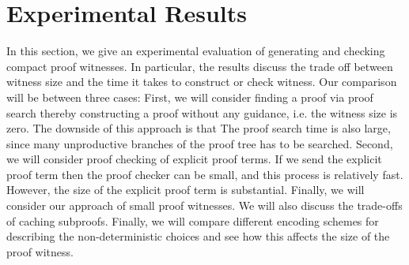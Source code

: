 \documentclass{llncs}
\newcommand{\vd}{\vdash}
\begin{document}







\section{Experimental Results}

In this section, we give an experimental evaluation of generating and
checking compact proof witnesses. In particular, the results discuss
the trade off between witness size and the time it takes to construct
or check witness. Our comparison will be between three cases: First,
we will consider finding a proof via proof search thereby constructing
a proof without any guidance, i.e. the witness size is zero. The
downside of this approach is that The proof search time is also large,
since many unproductive branches of the proof tree has to be
searched. Second, we will consider proof checking of explicit proof
terms. If we send the explicit proof term then the proof checker can
be small, and this process is relatively fast. However, the size of
the explicit proof term is substantial. Finally, we will consider our
approach of small proof witnesses. We will also discuss the trade-offs
of caching subproofs. Finally, we will compare different encoding
schemes for describing the non-deterministic choices and see how this
affects the size of the proof witness.
\end{document}
